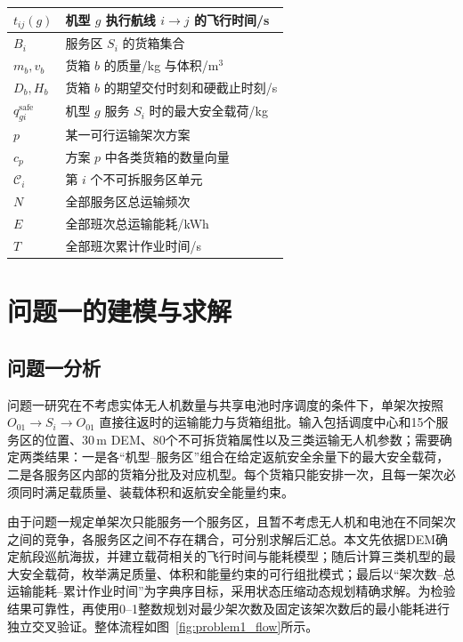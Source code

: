 \documentclass[bwprint,fontset=fandol]{gmcmthesis}
\begin{document}
\begin{table}[htp!]
\begin{tabularx}{0.9\textwidth}{|P{1.8cm}|L|}
  \hline
  $ t_{ij}(g) $  &  机型 $ g $ 执行航线 $ i \to j $ 的飞行时间/s    \\
  \hline
  $ B_i $  &  服务区 $ S_i $ 的货箱集合    \\
  \hline
  $ m_b, v_b $  &  货箱 $ b $ 的质量/kg 与体积/m$^3$    \\
  \hline
  $ D_b, H_b $  &  货箱 $ b $ 的期望交付时刻和硬截止时刻/s    \\
  \hline
  $ q_{gi}^{\mathrm{safe}} $  &  机型 $ g $ 服务 $ S_i $ 时的最大安全载荷/kg    \\
  \hline
  $ p $  &  某一可行运输架次方案    \\
  \hline
  $ c_p $  &  方案 $ p $ 中各类货箱的数量向量    \\
  \hline
  $ \mathcal C_i $  &  第 $ i $ 个不可拆服务区单元    \\
  \hline
  $ N $  &  全部服务区总运输频次    \\
  \hline
  $ E $  &  全部班次总运输能耗/kWh    \\
  \hline
  $ T $  &  全部班次累计作业时间/s    \\
  \hline
\end{tabularx}
\end{table}

\section{问题一的建模与求解}

\subsection{问题一分析}
问题一研究在不考虑实体无人机数量与共享电池时序调度的条件下，单架次按照
$O_{01}\to S_i\to O_{01}$ 直接往返时的运输能力与货箱组批。输入包括调度中心和15个服务区的位置、30\,m DEM、80个不可拆货箱属性以及三类运输无人机参数；需要确定两类结果：一是各“机型--服务区”组合在给定返航安全余量下的最大安全载荷，二是各服务区内部的货箱分批及对应机型。每个货箱只能安排一次，且每一架次必须同时满足载质量、装载体积和返航安全能量约束。

由于问题一规定单架次只能服务一个服务区，且暂不考虑无人机和电池在不同架次之间的竞争，各服务区之间不存在耦合，可分别求解后汇总。本文先依据DEM确定航段巡航海拔，并建立载荷相关的飞行时间与能耗模型；随后计算三类机型的最大安全载荷，枚举满足质量、体积和能量约束的可行组批模式；最后以“架次数--总运输能耗--累计作业时间”为字典序目标，采用状态压缩动态规划精确求解。为检验结果可靠性，再使用0--1整数规划对最少架次数及固定该架次数后的最小能耗进行独立交叉验证。整体流程如图~\ref{fig:problem1_flow}所示。
\end{document}

